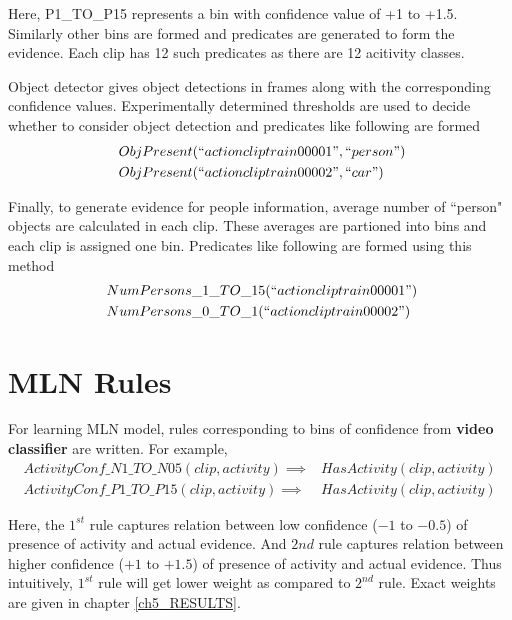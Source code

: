 Here, P1\_TO\_P15 represents a bin with confidence value of +1 to +1.5.
Similarly other bins are formed and predicates are generated to form the evidence.
Each clip has 12 such predicates as there are 12 acitivity classes.

Object detector \cite{voc-release4} gives object detections in frames
along with the corresponding confidence values. Experimentally determined thresholds
are used to decide whether to consider object detection and predicates like following are formed
\begin{equation}
	\begin{split}
		~ & ObjPresent(``actioncliptrain00001",``person") \\
		~ & ObjPresent(``actioncliptrain00002",``car")
	\end{split}
\end{equation}

Finally, to generate evidence for people information, average number of ``person"
objects are calculated in each clip. These averages are partioned into bins
and each clip is assigned one bin. Predicates like following are formed using this method
\begin{equation}
	\begin{split}
		~ & NumPersons\_1\_TO\_15(``actioncliptrain00001") \\
		~ & NumPersons\_0\_TO\_1(``actioncliptrain00002")
	\end{split}
\end{equation}





\section{MLN Rules}
For learning MLN model, rules corresponding to bins of confidence
from {\bf video classifier} are written.
For example,
\begin{equation}
	\begin{split}
		ActivityConf\_N1\_TO\_N05(clip,activity) \implies & HasActivity(clip,activity) \\
		ActivityConf\_P1\_TO\_P15(clip,activity) \implies & HasActivity(clip,activity)
	\end{split}
\end{equation}

Here, the $1^{st}$ rule captures relation between low confidence ($-1$ to $-0.5$) of presence
of activity and actual evidence. And $2{nd}$ rule captures relation between
higher confidence ($+1$ to $+1.5$) of presence of activity and actual evidence.
Thus intuitively, $1^{st}$ rule will get lower weight as compared to $2^{nd}$ rule.
Exact weights are given in chapter \ref{ch5_RESULTS}.

